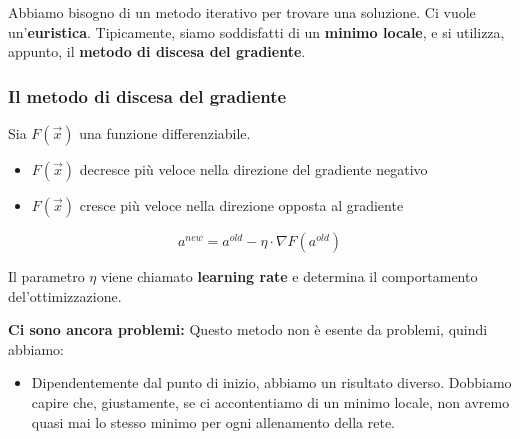Abbiamo bisogno di un metodo iterativo per trovare una soluzione. Ci vuole
un'\textbf{euristica}. Tipicamente, siamo soddisfatti di un \textbf{minimo
    locale}, e si utilizza, appunto, il \textbf{metodo di discesa del gradiente}.

\subsubsection{Il metodo di discesa del gradiente}
Sia $F(\vec{x})$ una funzione differenziabile.
\begin{itemize}
    \item $F(\vec{x})$ decresce più veloce nella direzione del gradiente negativo
    \item $F(\vec{x})$ cresce più veloce nella direzione opposta al gradiente
\end{itemize}

\begin{equation}
    a^{new} = a^{old} - \eta \cdot \nabla F(a^{old})
\end{equation}

Il parametro $\eta$ viene chiamato \textbf{learning rate} e determina il
comportamento del'ottimizzazione.

\textbf{Ci sono ancora problemi:} Questo metodo non è esente da problemi, quindi abbiamo:
\begin{itemize}
    \item Dipendentemente dal punto di inizio, abbiamo un risultato diverso. Dobbiamo
          capire che, giustamente, se ci accontentiamo di un minimo locale, non avremo
          quasi mai lo stesso minimo per ogni allenamento della rete.
\end{itemize}

